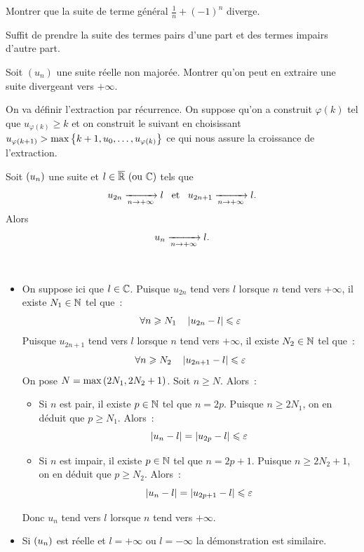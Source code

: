 \documentclass{magnoliaold}
\begin{document}
\begin{exos}
\exo Montrer que la suite de terme général $\frac{1}{n}+(-1)^n$ diverge.
\begin{sol}
Suffit de prendre la suite des termes pairs d'une part et des termes impairs d'autre part.
\end{sol}
\exo Soit $(u_n)$ une suite réelle non majorée. Montrer qu'on peut en
  extraire une suite divergeant vers $+\infty$.
  \begin{sol}
  On va définir l'extraction par récurrence. On suppose qu'on a construit $\varphi(k)$ tel que $u_{\varphi(k)}\geq k$ et on construit le suivant en choisissant $u_{\varphi(k+1)}> \max\left\{k+1,u_0,\ldots,u_{\varphi(k)}\right\}$ ce qui nous assure la croissance de l'extraction.
  \end{sol}
\end{exos}


 \begin{proposition}[utile=-3]
 Soit $\left(u_n\right)$ une suite et $l\in\text{$\overline{\mathbb{R}}$ (ou $\mathbb{C}$)}$  tels que
 \[u_{2n}\xrightarrow[n\rightarrow +\infty]{} l \quad\!\text{et}\quad\!
   u_{2n+1}\xrightarrow[n\rightarrow +\infty]{} l.\]
 Alors
 \[u_n \xrightarrow[n\rightarrow +\infty]{} l.\]
 \end{proposition}

 \begin{preuve}
 $\quad$
 \begin{itemize}
 \item On suppose ici que $l\in\mathbb{C}$. Puisque $u_{2n}$ tend vers $l$ lorsque $n$
   tend vers $+\infty$, il existe $N_1\in\mathbb{N}$ tel que~:
   \[\forall n\geqslant N_1 \quad \left|u_{2n}-l\right|\leqslant \varepsilon\]
   Puisque $u_{2n+1}$ tend vers $l$ lorsque $n$ tend vers $+\infty$, il existe
   $N_2\in\mathbb{N}$ tel que~:
   \[\forall n\geqslant N_2 \quad \left|u_{2n+1}-l\right|\leqslant \varepsilon\]
   On pose $N=\max\left(2N_1,2N_2+1\right)$. Soit $n\geq N$. Alors~:
   \begin{itemize}
   \item Si $n$ est pair, il existe $p\in\mathbb{N}$ tel que $n=2p$. Puisque
     $n\geq 2N_1$, on en déduit que $p\geq N_1$. Alors~:
     \[\left|u_n-l\right|=\left|u_{2p}-l\right| \leqslant \varepsilon\]
   \item Si $n$ est impair, il existe $p\in\mathbb{N}$ tel que $n=2p+1$. Puisque
     $n\geq 2N_2+1$, on en déduit que $p\geq N_2$. Alors~:
     \[\left|u_n-l\right|=\left|u_{2p+1}-l\right| \leqslant \varepsilon\]
   \end{itemize}
   Donc $u_n$ tend vers $l$ lorsque $n$ tend vers $+\infty$.
 \item Si $\left(u_n\right)$ est réelle et $l=+\infty$ ou $l=-\infty$ la démonstration
   est similaire.
 \end{itemize}
 \end{preuve}
\end{document}

